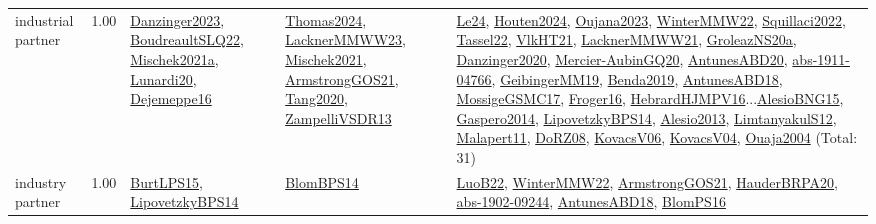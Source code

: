 {\begin{longtable}{p{3cm}r>{\raggedright\arraybackslash}p{6cm}>{\raggedright\arraybackslash}p{6cm}>{\raggedright\arraybackslash}p{8cm}}
\index{industrial partner}\index{Benchmarks!industrial partner}industrial partner &  1.00 & \hyperref[detail:Danzinger2023]{Danzinger2023}, \hyperref[detail:BoudreaultSLQ22]{BoudreaultSLQ22}, \hyperref[detail:Mischek2021a]{Mischek2021a}, \hyperref[detail:Lunardi20]{Lunardi20}, \hyperref[detail:Dejemeppe16]{Dejemeppe16} & \hyperref[detail:Thomas2024]{Thomas2024}, \hyperref[detail:LacknerMMWW23]{LacknerMMWW23}, \hyperref[detail:Mischek2021]{Mischek2021}, \hyperref[detail:ArmstrongGOS21]{ArmstrongGOS21}, \hyperref[detail:Tang2020]{Tang2020}, \hyperref[detail:ZampelliVSDR13]{ZampelliVSDR13} & \hyperref[detail:Le24]{Le24}, \hyperref[detail:Houten2024]{Houten2024}, \hyperref[detail:Oujana2023]{Oujana2023}, \hyperref[detail:WinterMMW22]{WinterMMW22}, \hyperref[detail:Squillaci2022]{Squillaci2022}, \hyperref[detail:Tassel22]{Tassel22}, \hyperref[detail:VlkHT21]{VlkHT21}, \hyperref[detail:LacknerMMWW21]{LacknerMMWW21}, \hyperref[detail:GroleazNS20a]{GroleazNS20a}, \hyperref[detail:Danzinger2020]{Danzinger2020}, \hyperref[detail:Mercier-AubinGQ20]{Mercier-AubinGQ20}, \hyperref[detail:AntunesABD20]{AntunesABD20}, \hyperref[detail:abs-1911-04766]{abs-1911-04766}, \hyperref[detail:GeibingerMM19]{GeibingerMM19}, \hyperref[detail:Benda2019]{Benda2019}, \hyperref[detail:AntunesABD18]{AntunesABD18}, \hyperref[detail:MossigeGSMC17]{MossigeGSMC17}, \hyperref[detail:Froger16]{Froger16}, \hyperref[detail:HebrardHJMPV16]{HebrardHJMPV16}...\hyperref[detail:AlesioBNG15]{AlesioBNG15}, \hyperref[detail:Gaspero2014]{Gaspero2014}, \hyperref[detail:LipovetzkyBPS14]{LipovetzkyBPS14}, \hyperref[detail:Alesio2013]{Alesio2013}, \hyperref[detail:LimtanyakulS12]{LimtanyakulS12}, \hyperref[detail:Malapert11]{Malapert11}, \hyperref[detail:DoRZ08]{DoRZ08}, \hyperref[detail:KovacsV06]{KovacsV06}, \hyperref[detail:KovacsV04]{KovacsV04}, \hyperref[detail:Ouaja2004]{Ouaja2004} (Total: 31)\\
\index{industry partner}\index{Benchmarks!industry partner}industry partner &  1.00 & \hyperref[detail:BurtLPS15]{BurtLPS15}, \hyperref[detail:LipovetzkyBPS14]{LipovetzkyBPS14} & \hyperref[detail:BlomBPS14]{BlomBPS14} & \hyperref[detail:LuoB22]{LuoB22}, \hyperref[detail:WinterMMW22]{WinterMMW22}, \hyperref[detail:ArmstrongGOS21]{ArmstrongGOS21}, \hyperref[detail:HauderBRPA20]{HauderBRPA20}, \hyperref[detail:abs-1902-09244]{abs-1902-09244}, \hyperref[detail:AntunesABD18]{AntunesABD18}, \hyperref[detail:BlomPS16]{BlomPS16}\\

\end{longtable}}
